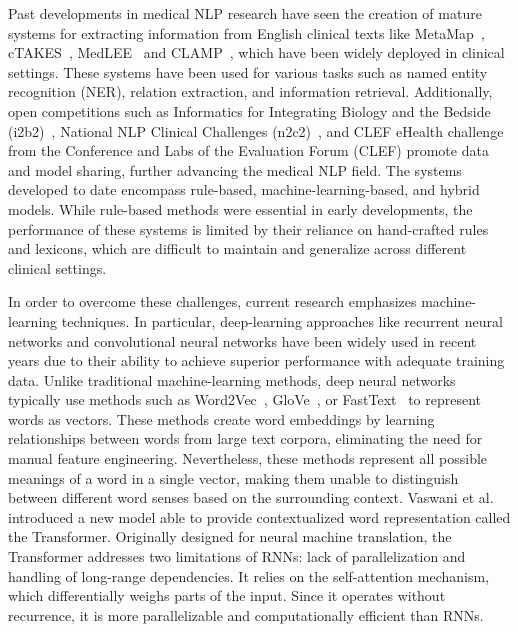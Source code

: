 Past developments in medical NLP research have seen the creation of mature
systems for extracting information from English clinical texts like
MetaMap~\cite{aronson2010overview}, cTAKES~\cite{savova2010mayo},
MedLEE~\cite{friedman1995architectural, friedman2000broad} and
CLAMP~\cite{soysal2018clamp}, which have been widely deployed in clinical
settings. These systems have been used for various tasks such as named entity
recognition (NER), relation extraction, and information retrieval. Additionally,
open competitions such as Informatics for Integrating Biology and the Bedside
(i2b2)~\cite{uzuner20112010}, National NLP Clinical Challenges
(n2c2)~\cite{henry20202018, stubbs2019cohort}, and CLEF eHealth
\cite{crestani2019experimental} challenge from the Conference and Labs of the
Evaluation Forum (CLEF) promote data and model sharing, further advancing the
medical NLP field. The systems developed to date encompass rule-based,
machine-learning-based, and hybrid models. While rule-based methods were
essential in early developments, the performance of these systems is limited by
their reliance on hand-crafted rules and lexicons, which are difficult to
maintain and generalize across different clinical settings. 

In order to overcome these challenges, current research emphasizes
machine-learning techniques. In particular, deep-learning approaches like
recurrent neural networks and convolutional neural networks have been widely
used in recent years due to their ability to achieve superior performance with
adequate training data. Unlike traditional machine-learning methods, deep neural
networks typically use methods such as Word2Vec~\cite{mikolov2013distributed},
GloVe~\cite{peters2018dissecting}, or FastText~\cite{joulin2017bag} to represent
words as vectors. These methods create word embeddings by learning relationships
between words from large text corpora, eliminating the need for manual feature
engineering. Nevertheless, these methods represent all possible meanings of a
word in a single vector, making them unable to distinguish between different
word senses based on the surrounding context. Vaswani et al.
\cite{vaswani2017attention} introduced a new model able to provide
contextualized word representation called the Transformer. Originally designed
for neural machine translation, the Transformer addresses two limitations of
RNNs: lack of parallelization and handling of long-range dependencies. It relies
on the self-attention mechanism, which differentially weighs parts of the input.
Since it operates without recurrence, it is more parallelizable and
computationally efficient than RNNs.

